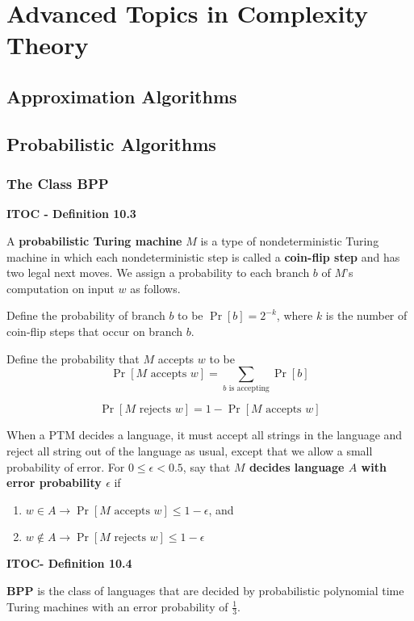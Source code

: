 \section{Advanced Topics in Complexity Theory}

\subsection{Approximation Algorithms}

\subsection{Probabilistic Algorithms}

\subsubsection{The Class BPP}

\begin{shaded}
\textbf{ITOC - Definition 10.3}

\medskip
A \textbf{probabilistic Turing machine} $M$ is a type of nondeterministic Turing machine in which each nondeterministic step is called a \textbf{coin-flip step} and has two legal next moves. We assign a probability to each branch $b$ of $M$'s computation on input $w$ as follows.

Define the probability of branch $b$ to be $\Pr[b] = 2^{-k}$, where $k$ is the number of coin-flip steps that occur on branch $b$.

Define the probability that $M$ accepts $w$ to be 
\[
\Pr[M \text{ accepts } w] = \sum_{b \text{ is accepting}} \Pr[b]
\]
\end{shaded}

\[
\Pr[M \text{ rejects } w] = 1 - \Pr[M \text{ accepts } w]
\]

When a PTM decides a language, it must accept all strings in the language and reject all string out of the language as usual, except that we allow a small probability of error. For $0 \leq \epsilon < 0.5$, say that \textbf{$M$ decides language $A$ with error probability $\epsilon$} if 
\begin{enumerate}
\item $w \in A \rightarrow \Pr[M \text{ accepts } w] \leq 1- \epsilon$, and
\item $w \not \in A \rightarrow \Pr[M \text{ rejects } w] \leq 1- \epsilon$
\end{enumerate}

\begin{shaded}
\textbf{ITOC- Definition 10.4}

\medskip
\textbf{BPP} is the class of languages that are decided by probabilistic polynomial time Turing machines with an error probability of $\frac{1}{3}$.
\end{shaded}

